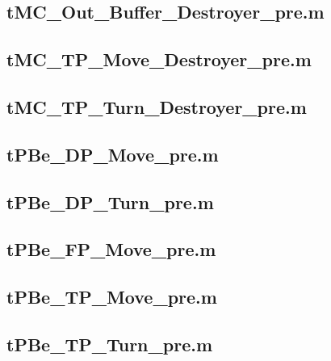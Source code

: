 \documentclass[runningheads,a4paper]{llncs}
\newcommand{\GPenSIM}{../GPenSIM}
\begin{document}
\subsection{tMC\_Out\_Buffer\_Destroyer\_pre.m}
\label{app:tMC_Out_Buffer_Destroyer_pre}


\subsection{tMC\_TP\_Move\_Destroyer\_pre.m}
\label{app:tMC_TP_Move_Destroyer_pre}


\subsection{tMC\_TP\_Turn\_Destroyer\_pre.m}
\label{app:tMC_TP_Turn_Destroyer_pre}


\subsection{tPBe\_DP\_Move\_pre.m}
\label{app:tPBe_DP_Move_pre}


\subsection{tPBe\_DP\_Turn\_pre.m}
\label{app:tPBe_DP_Turn_pre}


\subsection{tPBe\_FP\_Move\_pre.m}
\label{app:tPBe_FP_Move_pre}


\subsection{tPBe\_TP\_Move\_pre.m}
\label{app:tPBe_TP_Move_pre}


\subsection{tPBe\_TP\_Turn\_pre.m}
\label{app:tPBe_TP_Turn_pre}

\end{document}
